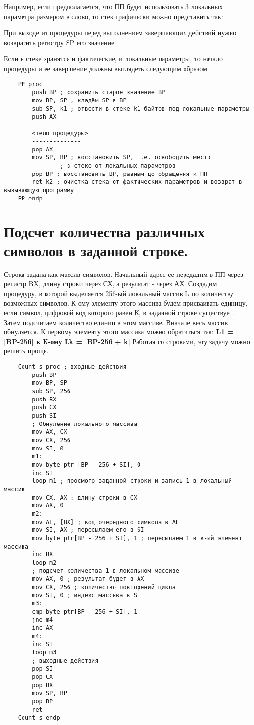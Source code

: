 Например, если предполагается, что ПП будет использовать 3 локальных параметра размером в слово, то стек графически можно представить так:
\begin{figure}
\end{figure}
При выходе из процедуры перед выполнением завершающих действий нужно возвратить регистру SP его значение.

Если в стеке хранятся и фактические, и локальные параметры, то начало процедуры и ее завершение должны выглядеть следующим образом:
\begin{verbatim}
    PP proc
        push BP ; сохранить старое значение ВР
        mov BP, SP ; кладём SP в ВР
        sub SP, k1 ; отвести в стеке k1 байтов под локальные параметры
        push AX
        --------------
        <тело процедуры>
        --------------
        pop AX
        mov SP, BP ; восстановить SP, т.е. освободить место
                ; в стеке от локальных параметров
        pop BP ; восстановить ВР, равным до обращения к ПП
        ret k2 ; очистка стека от фактических параметров и возврат в вызывающую программу
    PP endp
\end{verbatim}

\section{Подсчет количества различных символов в заданной строке.}

Строка задана как массив символов. Начальный адрес ее передадим в ПП через регистр BX, длину строки через СХ, а результат - через АХ. Создадим процедуру, в которой выделяется 256-ый локальный массив L по количеству возможных символов.
К-ому элементу этого массива будем присваивать единицу, если символ, цифровой код которого равен К, в заданной строке существует. Затем подсчитаем количество единиц в этом массиве. Вначале весь массив обнуляется.
К первому элементу этого массива можно обратиться так: \textbf{L1 = [BP-256] к К-ому Lk = [BP-256 + k]}
Работая со строками, эту задачу можно решить проще.
\begin{verbatim}
    Count_s proc ; входные действия
        push BP
        mov BP, SP
        sub SP, 256
        push BX
        push CX
        push SI
        ; Обнуление локального массива
        mov AX, CX
        mov CX, 256
        mov SI, 0
        m1:
        mov byte ptr [BP - 256 + SI], 0
        inc SI
        loop m1 ; просмотр заданной строки и запись 1 в локальный массив
        mov CX, AX ; длину строки в СХ
        mov AX, 0
        m2:
        mov AL, [BX] ; код очередного символа в AL
        mov SI, AX ; пересылаем его в SI
        mov byte ptr[BP - 256 + SI], 1 ; пересылаем 1 в к-ый элемент массива
        inc BX
        loop m2
        ; подсчет количества 1 в локальном массиве
        mov AX, 0 ; результат будет в АХ
        mov CX, 256 ; количество повторений цикла
        mov SI, 0 ; индекс массива в SI
        m3:
        cmp byte ptr[BP - 256 + SI], 1
        jne m4
        inc AX
        m4:
        inc SI
        loop m3
        ; выходные действия
        pop SI
        pop CX
        pop BX
        mov SP, BP
        pop BP
        ret
    Count_s endp
\end{verbatim}

